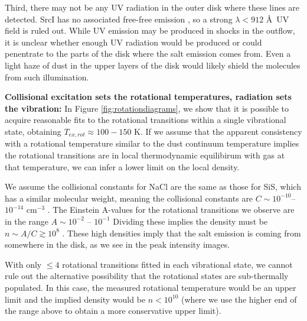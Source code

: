 \documentclass[twocolumn]{aastex62}
\newcommand{\sourcei}{SrcI\xspace}
\begin{document}
Third, there may not be any UV radiation in the outer disk where these lines
are detected.  \sourcei has no associated free-free emission
\citep{Plambeck2013a}, so a strong $\lambda<912$ \AA\ UV field is ruled out.  While UV
emission may be produced in shocks in the outflow, it is unclear whether enough
UV radiation would be produced or could penentrate to the parts of the disk where
the salt emission comes from.  Even a light haze of dust in the upper layers of
the disk would likely shield the molecules from such illumination.

\par{\textbf{Collisional excitation sets the rotational temperatures, radiation
sets the vibration:}}
In Figure \ref{fig:rotationdiagrams}, we show that it is possible to acquire
reasonable fits to the rotational transitions within a single vibrational state,
obtaining $T_{ex,rot}\approx100-150$ K.  If we assume that the apparent consistency
with a rotational temperature similar to the dust continuum temperature implies
the rotational transitions are in local thermodynamic equilibirum with gas at 
that temperature, we can infer a lower limit on the local density.

We assume the collisional constants for NaCl are the same as those for SiS,
which has a similar molecular weight, meaning the collisional constants are
$C\sim10^{-10}$--$10^{-14}$ cm$^{-3}$ \pers \citep{Dayou2006a}. 
The Einstein A-values for the rotational transitions we observe are in the range $A\sim10^{-2}$ -- $10^{-1}$ \pers
Dividing these implies the density must be $n\sim A/C \gtrsim10^8$ \percc.
These high densities imply that the salt emission is coming from
somewhere in the disk, as we see in the peak intensity images. 

With only $\leq4$ rotational transitions fitted in each vibrational
state, we cannot rule out the alternative possibility that the rotational
states are sub-thermally populated.  In this case, the measured rotational
temperature would be an upper limit and the implied density would be
$n<10^{10}$ \percc (where we use the higher end of the range above to obtain a
more conservative upper limit). 
\end{document}
